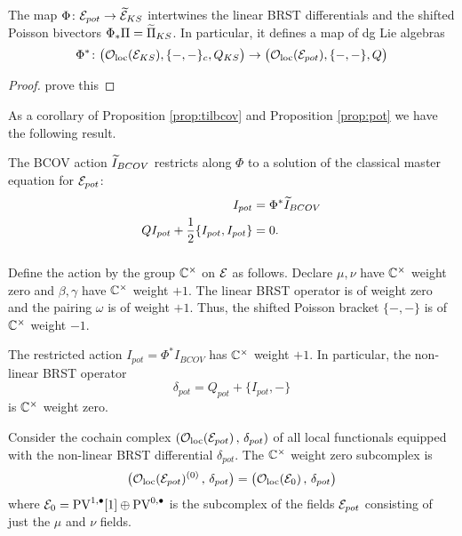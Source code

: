 \documentclass[11pt]{amsart}
\begin{document}
\begin{prop}
\label{prop:pot}
The map $\Phi \colon  \mathcal E_{pot} \to \widetilde{\mathcal E}_{KS}$ intertwines the linear BRST differentials and the shifted Poisson bivectors $\Phi_*\Pi = \widetilde{\Pi}_{KS}$. 
In particular, it defines a map of dg Lie algebras
\[
\Phi^* \colon \big({\mathcal O}_{\rm loc}(\mathcal E_{KS}),\{-,-\}_c, Q_{KS} \big) \to \big({\mathcal O}_{\rm loc}(\mathcal E_{pot}),\{-,-\}, Q \big)
\]
\end{prop}

\begin{proof}
prove this
\end{proof}

As a corollary of Proposition \ref{prop:tilbcov} and Proposition \ref{prop:pot} we have the following result. 

\begin{cor}
The BCOV action $\widetilde{I}_{BCOV}$ restricts along $\Phi$ to a solution of the classical master equation for $\mathcal E_{pot}$:
\begin{align*}
I_{pot} & = \Phi^* \widetilde{I}_{BCOV} \\
Q I_{pot} + \frac12 \{I_{pot},I_{pot}\} & = 0 .
\end{align*} 
\end{cor} 

\subsubsection{}

Define the action by the group $\mathbb C^\times$ on $\mathcal E$ as follows. 
Declare $\mu, \nu$ have $\mathbb C^\times$ weight zero and $\beta,\gamma$ have $\mathbb C^\times$ weight $+1$. 
The linear BRST operator is of weight zero and the pairing $\omega$ is of weight $+1$. 
Thus, the shifted Poisson bracket $\{-,-\}$ is of $\mathbb C^\times$ weight $-1$.

\begin{lem}
The restricted action $I_{pot} = \Phi^* I_{BCOV}$ has $\mathbb C^\times$ weight $+1$. 
In particular, the non-linear BRST operator 
\[
\delta_{pot} = Q_{pot} + \{I_{pot},-\}
\]
is $\mathbb C^\times$ weight zero.
\end{lem}

Consider the cochain complex $\left({\mathcal O}_{\rm loc}(\mathcal E_{pot}) \, , \, \delta_{pot} \right)$ of all local functionals equipped with the non-linear BRST differential $\delta_{pot}$. 
The $\mathbb C^\times$ weight zero subcomplex is 
\[
\big({\mathcal O}_{\rm loc}(\mathcal E_{pot})^{(0)} \, , \, \delta_{pot} \big) = \big({\mathcal O}_{\rm loc}(\mathcal E_0) \, , \, \delta_{pot} \big) 
\]
where $\mathcal E_0 = {\rm PV}^{1,\bullet}[1] \oplus {\rm PV}^{0,\bullet}$ is the subcomplex of the fields $\mathcal E_{pot}$ consisting of just the $\mu$ and $\nu$ fields.
\end{document}
